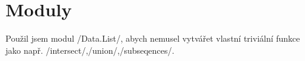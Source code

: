 \section*{Moduly}
Použil jsem modul \haskellline/Data.List/, abych nemusel vytvářet vlastní triviální funkce jako např. \haskellline/intersect/,\haskellline/union/,\haskellline/subseqences/.